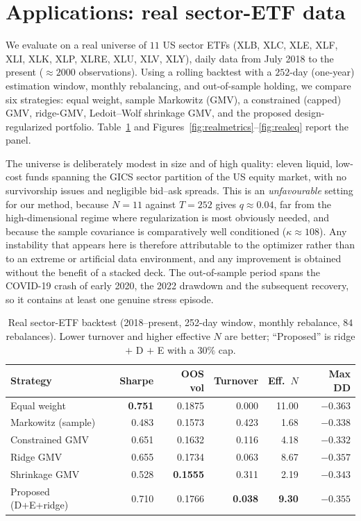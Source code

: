 \documentclass[11pt]{article}
\begin{document}
\section{Applications: real sector-ETF data}
\label{sec:applications}
We evaluate on a real universe of $11$ US sector ETFs (XLB, XLC, XLE, XLF, XLI,
XLK, XLP, XLRE, XLU, XLV, XLY), daily data from July 2018 to the present
($\approx2000$ observations). Using a rolling backtest with a $252$-day (one-year)
estimation window, monthly rebalancing, and out-of-sample holding, we compare six
strategies: equal weight, sample Markowitz (GMV), a constrained (capped) GMV,
ridge-GMV, Ledoit--Wolf shrinkage GMV, and the proposed design-regularized
portfolio. Table~\ref{tab:real} and Figures~\ref{fig:realmetrics}--\ref{fig:realeq}
report the panel.

The universe is deliberately modest in size and of high quality: eleven liquid,
low-cost funds spanning the GICS sector partition of the US equity market, with
no survivorship issues and negligible bid--ask spreads. This is an
\emph{unfavourable} setting for our method, because $N=11$ against $T=252$ gives
$q\approx0.04$, far from the high-dimensional regime where regularization is
most obviously needed, and because the sample covariance is comparatively well
conditioned ($\kappa\approx108$). Any instability that appears here is therefore
attributable to the optimizer rather than to an extreme or artificial data
environment, and any improvement is obtained without the benefit of a stacked
deck. The out-of-sample period spans the COVID-19 crash of early 2020, the
2022 drawdown and the subsequent recovery, so it contains at least one genuine
stress episode.

\begin{table}[htbp]
\centering
\caption{Real sector-ETF backtest (2018--present, 252-day window, monthly
  rebalance, $84$ rebalances). Lower turnover and higher effective $N$ are
  better; ``Proposed'' is ridge $+$ D $+$ E with a $30\%$ cap.}
\label{tab:real}
\begin{tabular}{lrrrrr}
\toprule
\textbf{Strategy} & \textbf{Sharpe} & \textbf{OOS vol} & \textbf{Turnover} & \textbf{Eff.\ $N$} & \textbf{Max DD} \\
\midrule
Equal weight             & \textbf{0.751} & 0.1875 & 0.000 & 11.00 & $-0.363$ \\
Markowitz (sample)       & 0.483 & 0.1573 & 0.423 & 1.68 & $-0.338$ \\
Constrained GMV          & 0.651 & 0.1632 & 0.116 & 4.18 & $-0.332$ \\
Ridge GMV                & 0.655 & 0.1734 & 0.063 & 8.67 & $-0.357$ \\
Shrinkage GMV            & 0.528 & \textbf{0.1555} & 0.311 & 2.19 & $-0.343$ \\
Proposed (D+E+ridge)     & 0.710 & 0.1766 & \textbf{0.038} & \textbf{9.30} & $-0.355$ \\
\bottomrule
\end{tabular}
\end{table}
\end{document}
